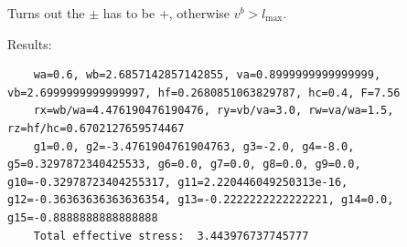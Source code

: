 Turns out the $\pm$ has to be $+$, otherwise $v^b > l_\text{max}$.

Results:
\begin{verbatim}
	wa=0.6, wb=2.6857142857142855, va=0.8999999999999999, vb=2.6999999999999997, hf=0.2680851063829787, hc=0.4, F=7.56
	rx=wb/wa=4.476190476190476, ry=vb/va=3.0, rw=va/wa=1.5, rz=hf/hc=0.6702127659574467
	g1=0.0, g2=-3.4761904761904763, g3=-2.0, g4=-8.0, g5=0.3297872340425533, g6=0.0, g7=0.0, g8=0.0, g9=0.0, g10=-0.32978723404255317, g11=2.220446049250313e-16, g12=-0.36363636363636354, g13=-0.2222222222222221, g14=0.0, g15=-0.8888888888888888
	Total effective stress:  3.443976737745777
\end{verbatim}
